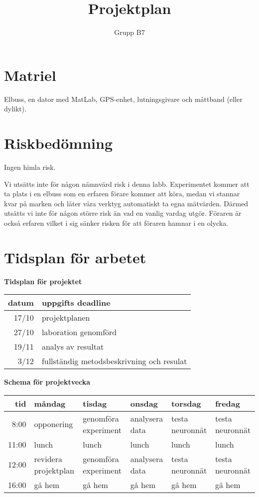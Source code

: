 \documentclass[]{article}
\title{Projektplan}
\author{Grupp B7}
\begin{document}
\maketitle
\tableofcontents
\clearpage



\section{Matriel}
Elbuss, en dator med MatLab, GPS-enhet, lutningsgivare och
måttband (eller dylikt).



\section{Riskbedömning}
Ingen himla risk.

Vi utsätts inte för någon nämnvärd risk i denna labb.
Experimentet kommer att ta plats i en elbuss som en erfaren förare kommer att köra,
medan vi stannar kvar på marken och låter våra verktyg automatiskt ta egna mätvärden.
Därmed utsätts vi inte för någon större risk än vad en vanlig vardag utgör.
Föraren är också erfaren vilket i sig sänker risken för att föraren hamnar i en olycka.

\section{Tidsplan för arbetet}
\begin{center}
	{\textbf{Tidsplan för projektet}} \par
	\begin{tabular}{r | l}
		datum & uppgifts deadline \\ \hline
		17/10 & projektplanen \\
		27/10 & laboration genomförd \\
		19/11 & analys av resultat \\
		3/12 & fullständig metodsbeskrivning och resulat \\
		\hline
	\end{tabular}

	\vspace{0.75cm}

	{\textbf{Schema för projektvecka}} \par
	\begin{tabular}{r | l l l l l}
		tid & måndag & tisdag & onsdag & torsdag & fredag \\ \hline
		8:00 & opponering & genomföra experiment & analysera data & testa
			neuronnät & testa neuronnät \\
		11:00 & lunch & lunch & lunch & lunch & lunch \\
		12:00 & revidera projektplan & genomföra experiment & analysera data &
			testa neuronnät & testa neuronnät \\
		16:00 & gå hem & gå hem & gå hem & gå hem & gå hem \\
		\hline
	\end{tabular}
\end{center}

\clearpage
\printbibliography
\end{document}
